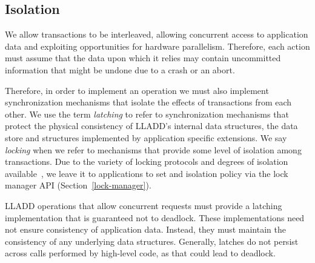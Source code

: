 \documentclass[10pt,letterpaper,twocolumn,english]{article}
\newcommand{\yad}{LLADD\xspace}
\begin{document}
\subsection{Isolation}
\label{Isolation}

We allow transactions to be interleaved, allowing concurrent access to
application data and exploiting opportunities for hardware
parallelism.  Therefore, each action must assume that the
data upon which it relies may contain uncommitted
information that might be undone due to a crash or an abort.


Therefore, in order to implement an operation we must also implement
synchronization mechanisms that isolate the effects of transactions
from each other.  We use the term {\em latching} to refer to
synchronization mechanisms that protect the physical consistency of
\yad's internal data structures, the data store and structures implemented by application specific extensions.  We say {\em
locking} when we refer to mechanisms that provide some level of
isolation among transactions.  
Due to the variety of locking protocols and degrees of isolation available~\cite{multipleGenericLocking}, we leave it to applications to set and isolation policy via the lock manager API (Section~\ref{lock-manager}).


\yad operations that allow concurrent requests must provide a latching
implementation that is guaranteed not to deadlock.
These implementations need not ensure consistency of application data.
Instead, they must maintain the consistency of any underlying data
structures.  Generally, latches do not persist across calls performed
by high-level code, as that could lead to deadlock.
\end{document}
